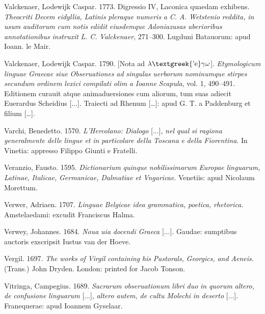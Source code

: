 Valckenaer, Lodewijk Caspar. 1773. Digressio IV, Laconica quaedam exhibens. \textit{Theocriti} \textit{Decem} \textit{eidyllia,} \textit{Latinis} \textit{pleraque} \textit{numeris} \textit{a} \textit{C.} \textit{A.} \textit{Wetstenio} \textit{reddita,} \textit{in} \textit{usum} \textit{auditorum} \textit{cum} \textit{notis} \textit{edidit} \textit{eiusdemque} \textit{Adoniazusas} \textit{uberioribus} \textit{annotationibus} \textit{instruxit} \textit{L.} \textit{C.} \textit{Valckenaer}, 271–300. Lugduni Batauorum: apud Ioann. le Mair.

Valckenaer, Lodewijk Caspar. 1790. [Nota ad $\lambda \text{\textgreek{'e}}\gamma \omega $]. \textit{Etymologicum} \textit{linguae} \textit{Graecae} \textit{siue} \textit{Obseruationes} \textit{ad} \textit{singulas} \textit{uerborum} \textit{nominumque} \textit{stirpes} \textit{secundum} \textit{ordinem} \textit{lexici} \textit{compilati} \textit{olim} \textit{a} \textit{Ioanne} \textit{Scapula}, vol. 1, 490–491. Editionem curauit atque animaduersiones cum aliorum, tum suas adiecit Euerardus Scheidius [...]. Traiecti ad Rhenum […]: apud G. T. a Paddenburg et filium […].

Varchi, Benedetto. 1570. \textit{L’Hercolano:} \textit{Dialogo} [...], \textit{nel} \textit{qual} \textit{si} \textit{ragiona} \textit{generalmente} \textit{delle} \textit{lingue} \textit{et} \textit{in} \textit{particolare} \textit{della} \textit{Toscana} \textit{e} \textit{della} \textit{Fiorentina}. In Vinetia: appresso Filippo Giunti e Fratelli.

Veranzio, Fausto. 1595. \textit{Dictionarium} \textit{quinque} \textit{nobilissimarum} \textit{Europae} \textit{linguarum,} \textit{Latinae,} \textit{Italicae,} \textit{Germanicae,} \textit{Dalmatiae} \textit{et} \textit{Vngaricae}. Venetiis: apud Nicolaum Morettum.

Verwer, Adriaen. 1707. \textit{Linguae} \textit{Belgicae} \textit{idea} \textit{grammatica,} \textit{poetica,} \textit{rhetorica}. Amstelaedami: excudit Franciscus Halma.

Verwey, Johannes. 1684. \textit{Noua} \textit{uia} \textit{docendi} \textit{Graeca} [...]. Gaudae: sumptibus auctoris exscripsit Iustus van der Hoeve.

Vergil. 1697. \textit{The} \textit{works} \textit{of} \textit{Virgil} \textit{containing} \textit{his} \textit{Pastorals,} \textit{Georgics,} \textit{and} \textit{Aeneis}. (Trans.) John Dryden. London: printed for Jacob Tonson.

Vitringa, Campegius. 1689. \textit{Sacrarum} \textit{obseruationum} \textit{libri} \textit{duo} \textit{in} \textit{quorum} \textit{altero,} \textit{de} \textit{confusione} \textit{linguarum} [...], \textit{altero} \textit{autem,} \textit{de} \textit{cultu} \textit{Molechi} \textit{in} \textit{deserto} [...]. Franequerae: apud Ioannem Gyselaar.

